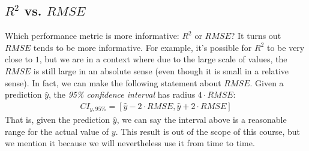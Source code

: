 \documentclass[12pt, a4paper]{article}
\theoremstyle{definition}
\begin{document}
	\subsection*{$R^2$ vs. $RMSE$}
	Which performance metric is more informative: $R^2$ or $RMSE$? It turns out
	$RMSE$ tends to be more informative.  For example, it's possible for $R^2$ to be very
	close to $1$, but we are in a context where due to the large scale of values,
	the $RMSE$ is still large in an absolute sense (even though it is small in a relative
	sense). In fact, we can make the following statement about $RMSE$. Given a prediction
	$\hat{y}$, the \emph{95\% confidence interval} has radius $4\cdot RMSE$:
	\begin{align*}
		CI_{y, 95\%} = [\hat{y} - 2\cdot RMSE, \hat{y} + 2 \cdot RMSE]
	\end{align*}
	That is, given the prediction $\hat{y}$, we can say the interval above is a reasonable
	range for the actual value of $y$. This result is out of the scope of this course,
	but we mention it because we will nevertheless use it from time to time.
\end{document}
